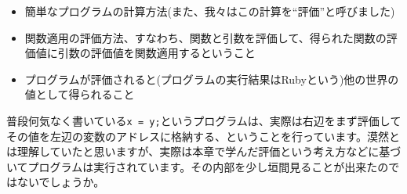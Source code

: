 \begin{itemize}
\item 簡単なプログラムの計算方法(また、我々はこの計算を“評価”と呼びました)
\item 関数適用の評価方法、すなわち、関数と引数を評価して、得られた関数の評価値に引数の評価値を関数適用するということ
\item プログラムが評価されると(プログラムの実行結果はRubyという)他の世界の値として得られること
\end{itemize}

普段何気なく書いている{\tt x = y;}というプログラムは、実際は右辺をまず評価してその値を左辺の変数のアドレスに格納する、ということを行っています。漠然とは理解していたと思いますが、実際は本章で学んだ評価という考え方などに基づいてプログラムは実行されています。その内部を少し垣間見ることが出来たのではないでしょうか。
